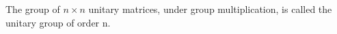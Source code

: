 The group of \ensuremath{n \times n} unitary matrices, under group multiplication,
is called the unitary group of order n.
